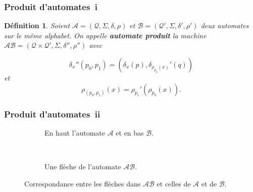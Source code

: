 \documentclass[11pt]{beamer}
\newtheorem{defi}{Définition}
\begin{document}
\begin{frame}
  \frametitle{Produit d'automates~i}
  \begin{defi}
    Soient $\mathcal{A} = \left(\mathcal{Q}, \Sigma, \delta, \rho\right)$ et $\mathcal{B} = \left(\mathcal{Q'}, \Sigma, \delta', \rho'\right)$ deux automates sur le même alphabet. On appelle \textbf{\textit{automate produit}} la machine $\mathcal{AB} = \left(\mathcal{Q}\times\mathcal{Q'}, \Sigma, \delta'', \rho''\right)$ avec

    \[ \delta_x''(p_0, p_1) = (\delta_x(p), \delta_{\rho_{p_0}(x)}'(q))\]
    et
    \[ \rho_{(p_0,p_1)}(x) = \rho_{p_1}'(\rho_{p_0}(x)). \]
  \end{defi}
\end{frame}

\begin{frame}
  \frametitle{Produit d'automates~ii}
  \begin{figure}[h!]
    \begin{subfigure}[b]{0.3\textwidth}
      \centering
      \caption{En haut l'automate $\mathcal{A}$ et en bas $\mathcal{B}$.}
    \end{subfigure}
    ~
    \begin{subfigure}[b]{0.3\textwidth}
      \centering
      \caption{Une flèche de l'automate $\mathcal{AB}$.}
    \end{subfigure}
    \caption{Correspondance entre les flèches dans $\mathcal{AB}$ et celles de $\mathcal{A}$ et de $\mathcal{B}$.}
  \end{figure}
\end{frame}
\end{document}
